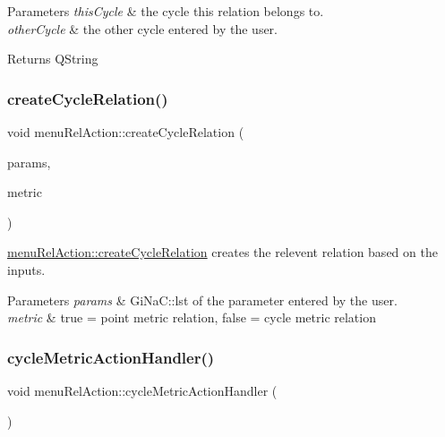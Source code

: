 \begin{DoxyParams}{Parameters}
{\em this\+Cycle} & the cycle this relation belongs to. \\
\hline
{\em other\+Cycle} & the other cycle entered by the user. \\
\hline
\end{DoxyParams}
\begin{DoxyReturn}{Returns}
Q\+String 
\end{DoxyReturn}
\mbox{\label{classmenu_rel_action_a64a27674825379ba110fb2117a572ffe}} 
\subsubsection{\texorpdfstring{create\+Cycle\+Relation()}{createCycleRelation()}}
{\footnotesize\ttfamily void menu\+Rel\+Action\+::create\+Cycle\+Relation (\begin{DoxyParamCaption}\item[{const Gi\+Na\+C\+::lst \&}]{params,  }\item[{const bool \&}]{metric }\end{DoxyParamCaption})}



\mbox{\hyperlink{classmenu_rel_action_a64a27674825379ba110fb2117a572ffe}{menu\+Rel\+Action\+::create\+Cycle\+Relation}} creates the relevent relation based on the inputs. 


\begin{DoxyParams}{Parameters}
{\em params} & Gi\+Na\+C\+::lst of the parameter entered by the user. \\
\hline
{\em metric} & true = point metric relation, false = cycle metric relation \\
\hline
\end{DoxyParams}
\mbox{\label{classmenu_rel_action_adbd43b99466f9ad2cde1934e1599ae4c}} 
\subsubsection{\texorpdfstring{cycle\+Metric\+Action\+Handler()}{cycleMetricActionHandler()}}
{\footnotesize\ttfamily void menu\+Rel\+Action\+::cycle\+Metric\+Action\+Handler (\begin{DoxyParamCaption}{ }\end{DoxyParamCaption})}



